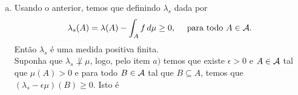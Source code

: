 \begin{homeworkProblem}[6]
\begin{solution}
\begin{enumerate}[a)]
      Em particular, como $\lambda$ é medida finita, temos que 
      \begin{align*}
        \int_{X}h\,d\mu\leq\lambda(X)<+\infty.
      \end{align*}
      Logo temos que
      \begin{align*}
        \sup S=\sup \int_{X}h\,d\mu\leq \lambda(X)<+\infty.
      \end{align*}
      Pelo que temos que se definimos $\alpha=\sup S$, então $\alpha<+\infty$.\\
      Sendo assim, pla caracterização de supremo, temos que dado $n\in\mathbb{Z}^{+}$ existe $h_n$ (com as condições de $S$) tal que
      \begin{align*}
        \alpha-\frac{1}{n}\leq \int_{X}h_n\,d\mu.
      \end{align*}
      Considere $g_n=\max\{h_1,\cdots,h_n\}$, logo temos que
      \begin{align*}
        \alpha-\frac{1}{n}\leq \int_{X}h_n\,d\mu\leq \int_{X}g_n\,d\mu,\quad\text{para todo }n\in\mathbb{Z}^{+}.
      \end{align*}
      Assim, usando a desigualdade anterior e que $g_n$ cumpre as condições de $S$ temos que
      \begin{align*}
        \lim_{n \to \infty}\int_{X}g_n\,d\mu=\alpha.
      \end{align*}
      Mas, note que como $g_n\in M^{+}(X,\cali{A})$, temos que pelo teorema da convergência monótona, existe $f\in M^{+}(X,\cali{A})$ tal que $g_n\to f$ pontoalmente e 
      \begin{align*}
        \int_{X}f\,d\mu=\lim_{n \to \infty}\int_{X}g_n\,d\mu=\alpha<+\infty.
      \end{align*}
      Mais que isso temos que para todo $A\in\cali{A}$ se cumpre que
      \begin{align*}
        \int_{A}f\,d\mu=\lim_{n \to \infty}\int_{A}g_n\,d\mu\leq\lambda(A).
      \end{align*}
    \item Usando o anterior, temos que definindo $\lambda_s$ dada por 
      \begin{align*}
        \lambda_s(A)=\lambda(A)-\int_{A}f\,d\mu\geq 0,\quad\text{ para todo }A\in\mathcal{A}.
      \end{align*}
      Então $\lambda_s$ é uma medida positiva finita.\\
      Suponha que $\lambda_s\not\perp \mu$, logo, pelo item $a)$ temos que existe $\epsilon>0$ e $A\in\cali{A}$ tal que $\mu(A)>0$ e para todo $B\in\mathcal{A}$ tal que $B\subseteq A$, temos que $\left( \lambda_s-\epsilon\mu \right)(B)\geq 0$. Isto é

\end{enumerate}
\end{solution}
\end{homeworkProblem}
